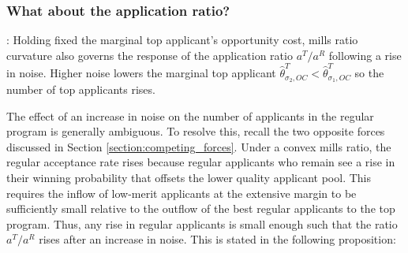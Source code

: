 \documentclass[12pt,reqno]{amsart}
\theoremstyle{definition}
\theoremstyle{plain} %
\begin{document}




\subsubsection{What about the application ratio?}\label{section:fixedoc_application_ratio}: Holding fixed the marginal top applicant's opportunity cost, mills ratio curvature also governs the response of the application ratio $a^T/a^R$ following a rise in noise. Higher noise lowers the marginal top applicant $\hat{\theta}^T_{\sigma_2,OC} < \hat{\theta}^T_{\sigma_1,OC}$ so the number of top applicants rises. 

\noindent The effect of an increase in noise on the number of applicants in the regular program is generally ambiguous. To resolve this, recall the two opposite forces discussed in Section \ref{section:competing_forces}. Under a convex mills ratio, the regular acceptance rate rises because regular applicants who remain see a rise in their winning probability that offsets the lower quality applicant pool. This requires the inflow of low-merit applicants at the extensive margin to be sufficiently small relative to the outflow of the best regular applicants to the top program. Thus, any rise in regular applicants is small enough such that the ratio $a^T/a^R$ rises after an increase in noise. This is stated in the following proposition: 
\end{document}
